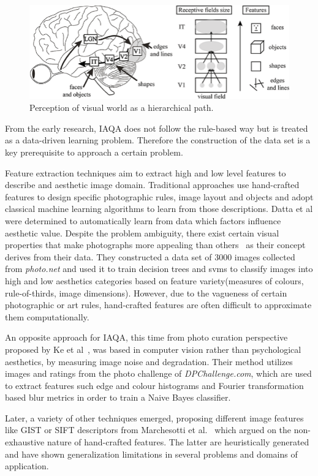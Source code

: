 \begin{figure}[ht!]
    \centering  
    \includegraphics[width=.53\textwidth]{figures/chap2/aesthetics/human_vision}
    \caption{Perception of visual world as a hierarchical path.}
    \label{c2:vision}
\end{figure}

From the early research, IAQA does not follow the rule-based way but is treated as a data-driven learning problem. Therefore the construction of the data set is a key prerequisite to approach a certain problem.

Feature extraction techniques aim to extract high and low level features to describe and aesthetic image domain.
Traditional approaches use hand-crafted features to design specific photographic rules, image layout and objects and adopt classical machine learning algorithms to learn from those descriptions. Datta et al were determined to automatically learn from data which factors influence aesthetic value. Despite the problem ambiguity, there exist certain visual properties that make photographs more appealing than others~\cite{datta2006studying} as their concept derives from their data. They constructed a data set of 3000 images collected from \textit{photo.net} and used it to train decision trees and svms to classify images into high and low aesthetics categories based on feature variety(measures of colours, rule-of-thirds, image dimensions). However, due to the vagueness of certain photographic or art rules, hand-crafted features are often difficult to approximate them computationally.

An opposite approach for IAQA, this time from photo curation perspective proposed by Ke et al~\cite{ke2006design}, was based in computer vision rather than psychological aesthetics, by measuring image noise and degradation. Their method utilizes images and ratings from the photo challenge of \textit{DPChallenge.com}, which are used to extract features such edge and colour histograms and Fourier transformation based blur metrics in order to train a Naive Bayes classifier.

Later, a variety of other techniques emerged, proposing different image features like GIST or SIFT descriptors from Marchesotti et al.~\cite{marchesotti2011assessing} which argued on the non-exhaustive nature of hand-crafted features. The latter are heuristically generated and have shown generalization limitations in several problems and domains of application.


